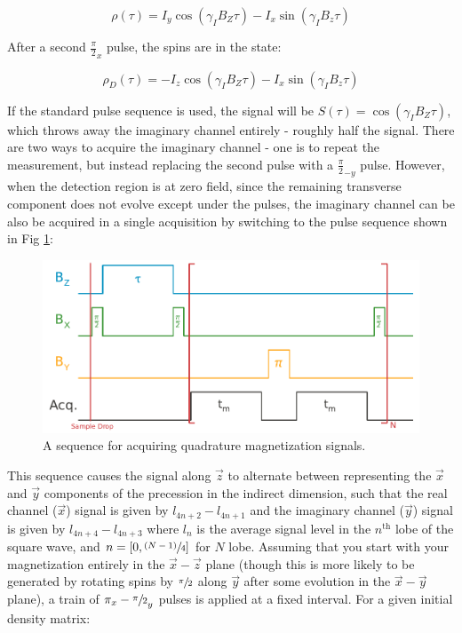 \documentclass[PaulGanssle-Thesis.tex]{subfiles}
\begin{document}
\begin{equation}
\label{eqn:FIDIndirectDM}
\rho(\tau) = I_{y}\cos(\gamma_{I}B_{Z}\tau) - I_{x}\sin(\gamma_{I}B_{z}\tau) 
\end{equation}

After a second $\frac{\pi}{2}_{x}$ pulse, the spins are in the state:

\begin{equation*}
\rho_D(\tau) = -I_{z}\cos(\gamma_{I}B_{Z}\tau) - I_{x}\sin(\gamma_{I}B_{z}\tau)
\end{equation*}

If the standard pulse sequence is used, the signal will be $S(\tau) = \cos(\gamma_{I}B_{Z}\tau)$, which throws away the imaginary channel entirely - roughly half the signal. There are two ways to acquire the imaginary channel - one is to repeat the measurement, but instead replacing the second pulse with a $\frac{\pi}{2}_{-y}$ pulse. However, when the detection region is at zero field, since the remaining transverse component does not evolve except under the pulses, the imaginary channel can be also be acquired in a single acquisition by switching to the pulse sequence shown in Fig \ref{fig:QuadraturePulseSequence}:
\begin{figure}[ht!]
\includegraphics[width=\tw]{figures/relaxometry/quad_fid_acq_sequence_diagram.pdf}
\caption{A sequence for acquiring quadrature magnetization signals.}
\label{fig:QuadraturePulseSequence}
\end{figure}

This sequence causes the signal along $\vec{z}$ to alternate between representing the $\vec{x}$ and $\vec{y}$ components of the precession in the indirect dimension, such that the real channel ($\vec{x}$) signal is given by $l_{4n+2}-l_{4n+1}$ and the imaginary channel ($\vec{y}$) signal is given by $l_{4n+4}-l_{4n+3}$ where $l_n$ is the average signal level in the $n^{\textrm{th}}$ lobe of the square wave, and $n = [0, \sfrac{(N-1)}{4}]$ for $N$ lobe. Assuming that you start with your magnetization entirely in the $\vec{x}-\vec{z}$ plane (though this is more likely to be generated by rotating spins by $\sfrac{\pi}{2}$ along $\vec{y}$ after some evolution in the $\vec{x}-\vec{y}$ plane), a train of $\pi_{x}-\sfrac{\pi}{2}_{y}$ pulses is applied at a fixed interval. For a given initial density matrix:
\end{document}
